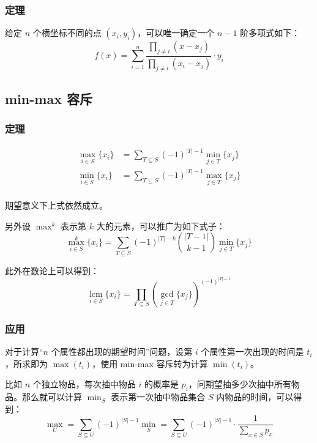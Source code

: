 \documentclass[10pt]{ctexart}
\begin{document}
\begin{multicols}{3}
    \subsubsection{定理}\label{ux5b9aux7406-1}

    给定 \(n\) 个横坐标不同的点 \((x_i, y_i)\)，可以唯一确定一个
    \(n - 1\) 阶多项式如下：\[
    f(x) = \sum_{i=1}^n \frac{\prod_{j\neq i} (x-x_j)}{\prod_{j\neq i}(x_i-x_j)} \cdot y_i
    \]

    \subsection{min-max 容斥}\label{min-max-ux5bb9ux65a5}

    \subsubsection{定理}\label{ux5b9aux7406-2}

    \[\begin{aligned}
    \max_{i\in S} \{x_i\} &= \sum_{T\subseteq S}(-1)^{|T| - 1}\min_{j\in T}\{x_j\} \\
    \min_{i\in S} \{x_i\} &= \sum_{T\subseteq S}(-1)^{|T| - 1}\max_{j\in T}\{x_j\} \\
    \end{aligned}\]

    期望意义下上式依然成立。

    另外设 \(\max^k\) 表示第 \(k\) 大的元素，可以推广为如下式子：\[
    \max_{i\in S}^k \{x_i\} = \sum_{T\subseteq S}(-1)^{|T| - k}\binom{|T - 1|}{k - 1} \min_{j\in T}\{x_j\}
    \]

    此外在数论上可以得到：\[
    \operatorname*{lcm}_{i\in S} \{x_i\} = \prod_{T\subseteq S} \left(\gcd_{j\in T}\{x_j\}\right)^{(-1)^{|T| - 1}}
    \]

    \subsubsection{应用}\label{ux5e94ux7528}

    对于计算``\(n\) 个属性都出现的期望时间''问题，设第 \(i\)
    个属性第一次出现的时间是 \(t_i\)，所求即为 \(\max(t_i)\)，使用
    min-max 容斥转为计算 \(\min(t_i)\)。

    比如 \(n\) 个独立物品，每次抽中物品 \(i\) 的概率是
    \(p_i\)，问期望抽多少次抽中所有物品。那么就可以计算 \(\min_S\)
    表示第一次抽中物品集合 \(S\)
    内物品的时间，可以得到：\[\max_{U}=\sum_{S\subseteq U}(-1)^{|S| - 1}\min_S = \sum_{S\subseteq U}(-1)^{|S| - 1}\cdot \frac{1}{\sum _{x\in S}p_x}\]


\end{multicols}
\end{document}

